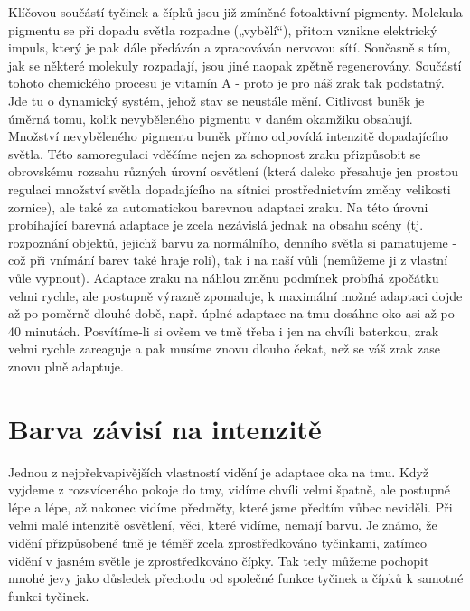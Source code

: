     Klíčovou součástí tyčinek a čípků jsou již zmíněné fotoaktivní pigmenty. Molekula pigmentu se
    při dopadu světla rozpadne („vybělí“), přitom vznikne elektrický impuls, který je pak dále
    předáván a zpracováván nervovou sítí. Současně s tím, jak se některé molekuly rozpadají, jsou
    jiné naopak zpětně regenerovány. Součástí tohoto chemického procesu je vitamín A - proto je pro
    náš zrak tak podstatný. Jde tu o dynamický systém, jehož stav se neustále mění. Citlivost buněk
    je úměrná tomu, kolik nevyběleného pigmentu v daném okamžiku obsahují. Množství nevyběleného
    pigmentu buněk přímo odpovídá intenzitě dopadajícího světla. Této samoregulaci vděčíme nejen za
    schopnost zraku přizpůsobit se obrovskému rozsahu různých úrovní osvětlení (která daleko
    přesahuje jen prostou regulaci množství světla dopadajícího na sítnici prostřednictvím změny
    velikosti zornice), ale také za automatickou barevnou adaptaci zraku. Na této úrovni probíhající
    barevná adaptace je zcela nezávislá jednak na obsahu scény (tj. rozpoznání objektů, jejichž
    barvu za normálního, denního světla si pamatujeme - což při vnímání barev také hraje roli), tak
    i na naší vůli (nemůžeme ji z vlastní vůle vypnout). Adaptace zraku na náhlou změnu podmínek
    probíhá zpočátku velmi rychle, ale postupně výrazně zpomaluje, k maximální možné adaptaci dojde
    až po poměrně dlouhé době, např. úplné adaptace na tmu dosáhne oko asi až po 40 minutách.
    Posvítíme-li si ovšem ve tmě třeba i jen na chvíli baterkou, zrak velmi rychle zareaguje a pak
    musíme znovu dlouho čekat, než se váš zrak zase znovu plně adaptuje.

    
  \section{Barva závisí na intenzitě}\label{fyz:IchapXXXVsecII}
    Jednou z nejpřekvapivějších vlastností vidění je adaptace oka na tmu. Když vyjdeme z 
    rozsvíceného pokoje do tmy, vidíme chvíli velmi špatně, ale postupně lépe a lépe, až nakonec 
    vidíme předměty, které jsme předtím vůbec neviděli. Při velmi malé intenzitě osvětlení, věci, 
    které vidíme, nemají barvu. Je známo, že vidění přizpůsobené tmě je téměř zcela zprostředkováno 
    tyčinkami, zatímco vidění v jasném světle je zprostředkováno čípky. Tak tedy můžeme pochopit 
    mnohé jevy jako důsledek přechodu od společné funkce tyčinek a čípků k samotné funkci tyčinek.
    
